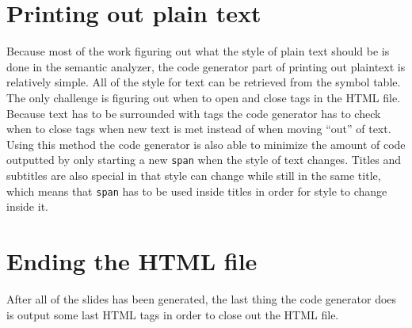\section{Printing out plain text}
Because most of the work figuring out what the style of plain text should be is done in the semantic analyzer, the code generator part of printing out plaintext is relatively simple. All of the style for text can be retrieved from the symbol table. The only challenge is figuring out when to open and close tags in the HTML file. Because text has to be surrounded with tags the code generator has to check when to close tags when new text is met instead of when moving ``out'' of text. Using this method the code generator is also able to minimize the amount of code outputted by only starting a new \texttt{span} when the style of text changes. Titles and subtitles are also special in that style can change while still in the same title, which means that \texttt{span} has to be used inside titles in order for style to change inside it.

\section{Ending the HTML file}
After all of the slides has been generated, the last thing the code generator does is output some last HTML tags in order to close out the HTML file.